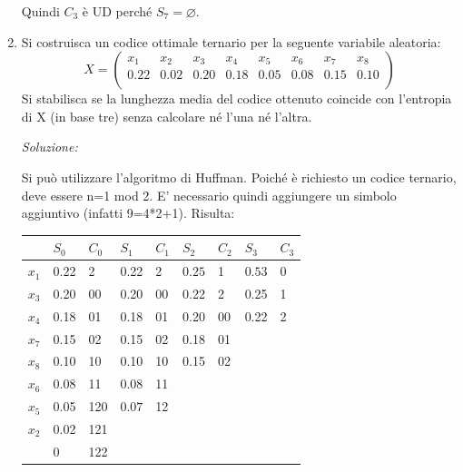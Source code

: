 \begin{enumerate}
       Quindi $C_3$ è UD perché $S_7=\varnothing$.

        \bigskip
\item Si costruisca un codice ottimale ternario per la seguente variabile aleatoria:
      \[ X = \left(
        \begin{array}{cccccccc}
           x_1  & x_2  & x_3  & x_4  & x_5  & x_6  & x_7  & x_8 \\
           0.22 & 0.02 & 0.20 & 0.18 & 0.05 & 0.08 & 0.15 & 0.10 \\
        \end{array} \right)
       \]
       Si stabilisca se la lunghezza media del codice ottenuto coincide con l'entropia di X (in base tre) 
       senza calcolare né l'una né l'altra.
       \bigskip
       \bigskip

       \textit{Soluzione:}

       \noindent
       Si può utilizzare l'algoritmo di Huffman. Poiché è richiesto un codice ternario, deve essere n=1 mod 2.
       E' necessario quindi aggiungere un simbolo aggiuntivo (infatti 9=4*2+1).
       Risulta:
       \begin{table}[htbp]
       \begin{center}
        \begin{tabular}{l || l|l|| l|l|| l|l|| l|l}
            &$S_0$ &$C_0$&$S_1$       & $C_1$& $S_2$        & $C_2$& $S_3$        & $C_3$ \\
       \hline
      $x_1$ & 0.22 &2  & 0.22           &2  &$\boxed{0.25}$ & 1  &$\boxed{0.53}$  & 0 \\
      $x_3$ & 0.20 &00 & 0.20           &00 &0.22           & 2  &0.25            & 1 \\
      $x_4$ & 0.18 &01 & 0.18           &01 &0.20           & 00 &0.22            & 2 \\
      $x_7$ & 0.15 &02 & 0.15           &02 &0.18           & 01 &                & \\
      $x_8$ & 0.10 &10 & 0.10           &10 &0.15           & 02 &                & \\
      $x_6$ & 0.08 &11 & 0.08           &11 &               &    &                & \\
      $x_5$ & 0.05 &120 & $\boxed{0.07}$ &12 &               &    &                & \\
      $x_2$ & 0.02 &121 &                &   &               &    &                & \\
        \hline
            & 0    &122 & & & & & &\\    
       \end{tabular}
       \end{center}
       \end{table} 


\end{enumerate}

